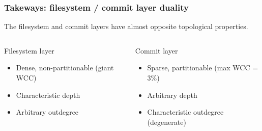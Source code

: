 \documentclass[aspectratio=169,xcolor=table]{beamer}
\begin{document}
    \begin{frame}
        \frametitle{Takeways: filesystem / commit layer duality}

        \begin{block}{}
            The filesystem and commit layers have almost opposite topological
            properties.
        \end{block}

        \begin{columns}
            \begin{block}{Filesystem layer}
                \begin{itemize}
                    \item Dense, non-partitionable (giant WCC)
                    \item Characteristic depth
                    \item Arbitrary outdegree
                \end{itemize}
                \begin{center}
                    \scalebox{0.7}{}
                \end{center}
            \end{block}

            \begin{block}{Commit layer}
                \begin{itemize}
                    \item Sparse, partitionable (max WCC = 3\%)
                    \item Arbitrary depth
                    \item Characteristic outdegree (degenerate)
                \end{itemize}
                \begin{center}
                    \scalebox{0.5}{}
                \end{center}
            \end{block}
        \end{columns}
    \end{frame}
\end{document}
